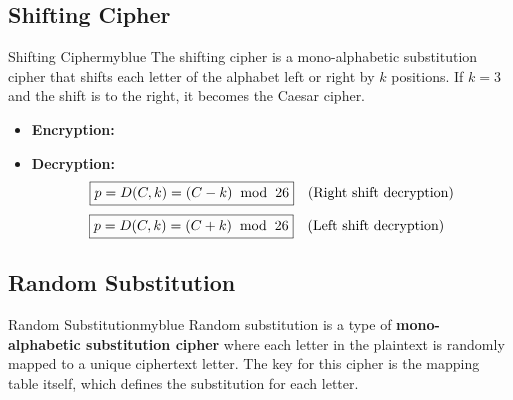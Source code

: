 \subsection{Shifting Cipher}
\begin{prettyBox}{Shifting Cipher}{myblue}
The shifting cipher is a mono-alphabetic substitution cipher that shifts each
letter of the alphabet left or right by \( k \) positions.
If \( k = 3 \) and the shift is to the right, it becomes 
the Caesar cipher.

\begin{itemize}
    \item \textbf{Encryption:}  
        \begin{center}
         \quad {}
        
        \vspace{0.15cm}
        \hspace{-0.25cm} \quad {}   
        \end{center}
            \item \textbf{Decryption:}  
                \[\boxed{p = D(C,k) = (C - k) \hspace{0.2cm} \text{mod} \hspace{0.2cm} 26} \quad \text{(Right shift decryption)}\]  
                \[\hspace{-0.25cm}\boxed{p = D(C,k) = (C + k) \hspace{0.2cm}\text{mod}\hspace{0.2cm} 26} \quad \text{(Left shift decryption)}\]  
\end{itemize}
\end{prettyBox}

\vspace{1cm}

\subsection{Random Substitution}
\begin{prettyBox}{Random Substitution}{myblue}
Random substitution is a type of \textbf{mono-alphabetic substitution cipher} 
where each letter in the plaintext is randomly mapped to a unique ciphertext
letter. The key for this cipher is the mapping table itself, which defines
the substitution for each letter.
\end{prettyBox}


